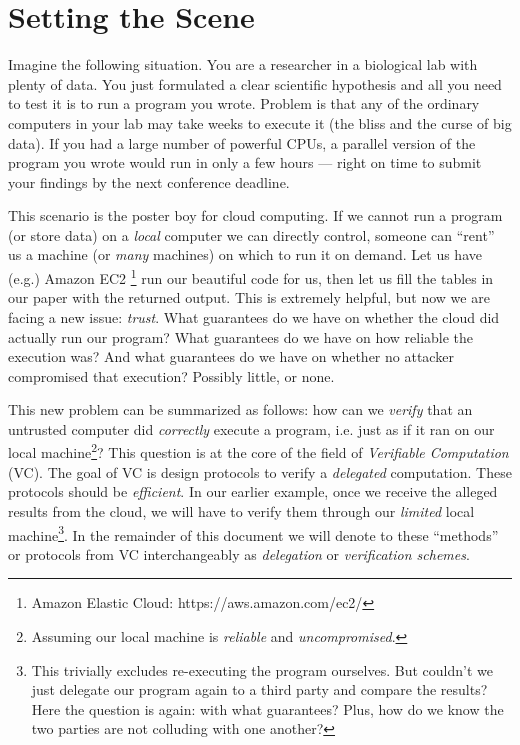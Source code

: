 
\section{Setting the Scene}

Imagine the following situation.
You are a researcher in a biological lab with plenty of data. You just formulated a clear scientific hypothesis and all you need to test it is to run a program you wrote. Problem is that any of the ordinary computers in your lab may take weeks to execute it (the bliss and the curse of big data). If you had a large number of powerful CPUs, a parallel version of the program you wrote would run in only a few hours --- right on time to submit your findings by the next conference deadline.

This scenario is the poster boy for cloud computing. If we cannot run a program (or store data) on a \textit{local} computer we can directly control, someone can ``rent'' us a machine (or \textit{many} machines) on which to run it on demand. Let us have (e.g.) Amazon EC2 \footnote{Amazon Elastic Cloud: https://aws.amazon.com/ec2/} run our beautiful code for us, then let us fill the tables in our paper with the returned output. This is extremely helpful, but now we are facing a new issue: \textit{trust}. 
What guarantees do we have on whether the cloud did actually run our program? What guarantees do we have on how reliable the execution was? And what guarantees do we have on whether no attacker compromised that execution? Possibly little, or none.

This new problem can be summarized as follows: how can we \textit{verify} that an untrusted computer did \textit{correctly} execute a program, i.e. just as if it ran on our local machine\footnote{Assuming our local machine is \textit{reliable} and \textit{uncompromised}.}? 
This question is at the core of the field of \textit{Verifiable Computation} (VC). The goal of VC is design protocols to verify a \textit{delegated} computation. These protocols should be \textit{efficient}. In our earlier example, once we receive the alleged results from the cloud, we will have to verify them through our \textit{limited} local machine\footnote{This trivially excludes re-executing the program ourselves. But couldn't we just delegate our program again to a third party and compare the results? Here the question is again: with what guarantees? Plus, how do we know the two parties are not colluding with one another?}. In the remainder of this document we will denote to these ``methods'' or protocols from VC interchangeably as \textit{delegation} or \textit{verification schemes}.

